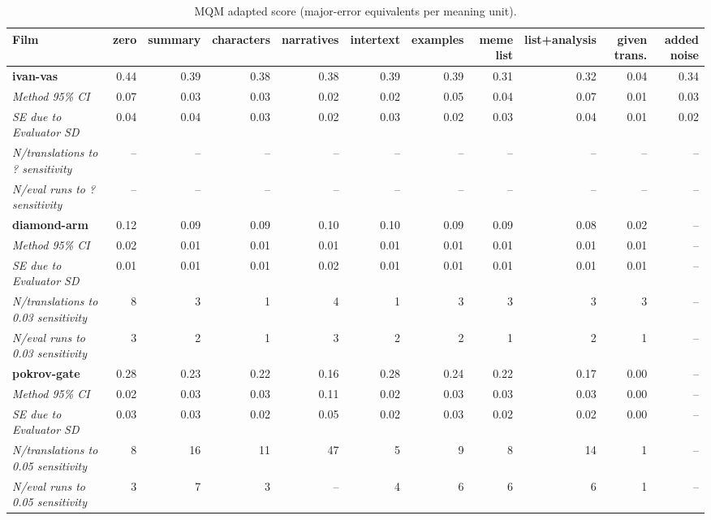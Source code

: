\begin{table}[ht]
\centering
\begin{adjustbox}{width=\textwidth}
\begin{tabular}{lrrrrrrrrr|r}
Film & zero & summary & characters & narratives & intertext & examples & meme list & list+analysis & given trans. & added noise \\
\hline
\textbf{ivan-vas} & 0.44 & 0.39 & 0.38 & 0.38 & 0.39 & 0.39 & 0.31 & 0.32 & 0.04 & 0.34 \\

\emph{Method 95\% CI} & 0.07 & 0.03 & 0.03 & 0.02 & 0.02 & 0.05 & 0.04 & 0.07 & 0.01 & 0.03 \\

\emph{SE due to Evaluator SD} & 0.04 & 0.04 & 0.03 & 0.02 & 0.03 & 0.02 & 0.03 & 0.04 & 0.01 & 0.02 \\

\emph{N/translations to ? sensitivity} & -- & -- & -- & -- & -- & -- & -- & -- & -- & -- \\

\emph{N/eval runs to ? sensitivity} & -- & -- & -- & -- & -- & -- & -- & -- & -- & -- \\

\hline

\textbf{diamond-arm} & 0.12 & 0.09 & 0.09 & 0.10 & 0.10 & 0.09 & 0.09 & 0.08 & 0.02 & -- \\

\emph{Method 95\% CI} & 0.02 & 0.01 & 0.01 & 0.01 & 0.01 & 0.01 & 0.01 & 0.01 & 0.01 & -- \\

\emph{SE due to Evaluator SD} & 0.01 & 0.01 & 0.01 & 0.02 & 0.01 & 0.01 & 0.01 & 0.01 & 0.01 & -- \\

\emph{N/translations to 0.03 sensitivity} & 8 & 3 & 1 & 4 & 1 & 3 & 3 & 3 & 3 & -- \\

\emph{N/eval runs to 0.03 sensitivity} & 3 & 2 & 1 & 3 & 2 & 2 & 1 & 2 & 1 & -- \\

\hline

\textbf{pokrov-gate} & 0.28 & 0.23 & 0.22 & 0.16 & 0.28 & 0.24 & 0.22 & 0.17 & 0.00 & -- \\

\emph{Method 95\% CI} & 0.02 & 0.03 & 0.03 & 0.11 & 0.02 & 0.03 & 0.03 & 0.03 & 0.00 & -- \\

\emph{SE due to Evaluator SD} & 0.03 & 0.03 & 0.02 & 0.05 & 0.02 & 0.03 & 0.02 & 0.02 & 0.00 & -- \\

\emph{N/translations to 0.05 sensitivity} & 8 & 16 & 11 & 47 & 5 & 9 & 8 & 14 & 1 & -- \\

\emph{N/eval runs to 0.05 sensitivity} & 3 & 7 & 3 & -- & 4 & 6 & 6 & 6 & 1 & -- \\

\hline
\end{tabular}
\end{adjustbox}
\caption{MQM adapted score (major-error equivalents per meaning unit).}
\label{tab:mqm-method-comparison}
\end{table}
